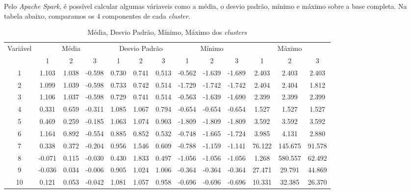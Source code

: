Pelo \emph{Apache Spark}, é possível calcular algumas váriaveis como a média, o desvio padrão, mínimo e máximo sobre a base completa. Na tabela abaixo, comparamos os 4 componentes de cada \emph{cluster}.

\pagebreak

\begin{table}
\tiny
\centering
        \caption{Média, Desvio Padrão, Mínimo, Máximo dos \emph{clusters}}
        \label{multiprogram}
        \begin{tabular}{c | c c c | c c c | c c c | c c c } \toprule
             Variável & \multicolumn{3}{|c|}{Média} & \multicolumn{3}{|c|}{Desvio Padrão} & \multicolumn{3}{|c|}{Mínimo} & \multicolumn{3}{|c}{Máximo}\\
             & 1 & 2 & 3 & 1 & 2 & 3 & 1 & 2 & 3 & 1 & 2 & 3\\
             \hline
            \multicolumn{1}{c|}{1} & 1.103  & 1.038  & -0.598 & 0.730 & 0.741 & 0.513 & -0.562 & -1.639 & -1.689 & 2.403   & 2.403   & 2.403  \\
            \multicolumn{1}{c|}{2} & 1.099  & 1.039  & -0.598 & 0.733 & 0.742 & 0.514 & -1.729 & -1.742 & -1.742 & 2.404   & 2.404   & 1.812  \\
            \multicolumn{1}{c|}{3} & 1.106  & 1.037  & -0.598 & 0.729 & 0.741 & 0.514 & -0.563 & -1.639 & -1.690 & 2.399   & 2.399   & 2.399  \\
            \multicolumn{1}{c|}{4} & 0.331  & 0.659  & -0.311 & 1.085 & 1.067 & 0.794 & -0.654 & -0.654 & -0.654 & 1.527   & 1.527   & 1.527  \\
            \multicolumn{1}{c|}{5} & 0.469  & 0.259  & -0.185 & 1.063 & 1.074 & 0.903 & -1.809 & -1.809 & -1.809 & 3.592   & 3.592   & 3.592  \\
            \multicolumn{1}{c|}{6} & 1.164  & 0.892  & -0.554 & 0.885 & 0.852 & 0.532 & -0.748 & -1.665 & -1.724 & 3.985   & 4.131   & 2.880  \\
            \multicolumn{1}{c|}{7} & 0.338  & 0.372  & -0.204 & 0.956 & 1.546 & 0.609 & -0.788 & -1.159 & -1.141 & 76.122  & 145.675 & 91.578 \\
            \multicolumn{1}{c|}{8} & -0.071 & 0.115  & -0.030 & 0.430 & 1.833 & 0.497 & -1.056 & -1.056 & -1.056 & 1.268   & 580.557 & 62.492 \\
            \multicolumn{1}{c|}{9} & -0.036 & 0.034  & -0.006 & 0.905 & 1.024 & 1.006 & -0.364 & -0.364 & -0.364 & 27.471  & 29.791  & 44.869 \\
            \multicolumn{1}{c|}{10} & 0.121  & 0.053  & -0.042 & 1.081 & 1.057 & 0.958 & -0.696 & -0.696 & -0.696 & 10.331  & 32.385  & 26.370 \\

\end{tabular}
\end{table}
